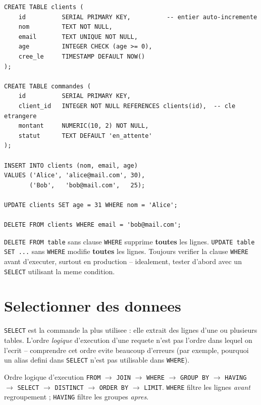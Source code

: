 \documentclass[11pt,a4paper]{article}
\begin{document}
\begin{lstlisting}
CREATE TABLE clients (
    id          SERIAL PRIMARY KEY,          -- entier auto-incremente
    nom         TEXT NOT NULL,
    email       TEXT UNIQUE NOT NULL,
    age         INTEGER CHECK (age >= 0),
    cree_le     TIMESTAMP DEFAULT NOW()
);

CREATE TABLE commandes (
    id          SERIAL PRIMARY KEY,
    client_id   INTEGER NOT NULL REFERENCES clients(id),  -- cle etrangere
    montant     NUMERIC(10, 2) NOT NULL,
    statut      TEXT DEFAULT 'en_attente'
);

INSERT INTO clients (nom, email, age)
VALUES ('Alice', 'alice@mail.com', 30),
       ('Bob',   'bob@mail.com',   25);

UPDATE clients SET age = 31 WHERE nom = 'Alice';

DELETE FROM clients WHERE email = 'bob@mail.com';
\end{lstlisting}

\begin{piege}
\texttt{DELETE FROM table} sans clause \texttt{WHERE} supprime \textbf{toutes}
les lignes. \texttt{UPDATE table SET ...} sans \texttt{WHERE} modifie
\textbf{toutes} les lignes. Toujours verifier la clause \texttt{WHERE} avant
d'executer, surtout en production -- idealement, tester d'abord avec un
\texttt{SELECT} utilisant la meme condition.
\end{piege}

\section{Selectionner des donnees}
\texttt{SELECT} est la commande la plus utilisee : elle extrait des lignes
d'une ou plusieurs tables. L'ordre \emph{logique} d'execution d'une requete
n'est pas l'ordre dans lequel on l'ecrit -- comprendre cet ordre evite
beaucoup d'erreurs (par exemple, pourquoi un alias defini dans \texttt{SELECT}
n'est pas utilisable dans \texttt{WHERE}).

\begin{infobox}{Ordre logique d'execution}
\texttt{FROM} $\rightarrow$ \texttt{JOIN} $\rightarrow$ \texttt{WHERE}
$\rightarrow$ \texttt{GROUP BY} $\rightarrow$ \texttt{HAVING} $\rightarrow$
\texttt{SELECT} $\rightarrow$ \texttt{DISTINCT} $\rightarrow$ \texttt{ORDER BY}
$\rightarrow$ \texttt{LIMIT}. \texttt{WHERE} filtre les lignes \emph{avant}
regroupement ; \texttt{HAVING} filtre les groupes \emph{apres}.
\end{infobox}
\end{document}
